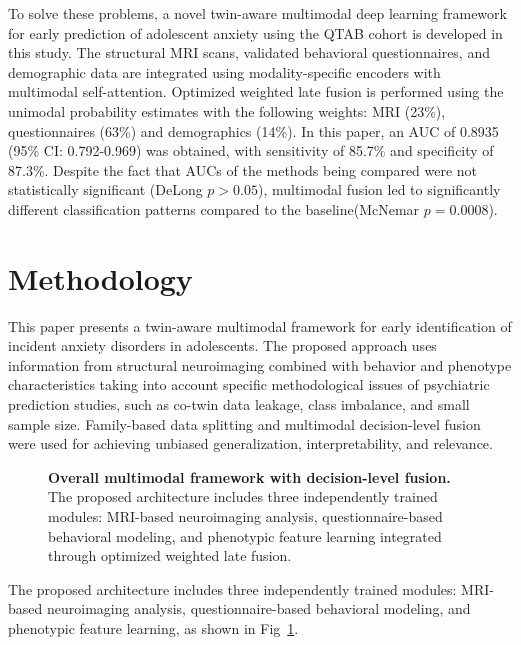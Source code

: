 \documentclass[10pt,letterpaper]{article}
\begin{document}
To solve these problems, a novel twin-aware multimodal deep learning framework for early prediction of adolescent anxiety using the QTAB cohort is developed in this study. The structural MRI scans, validated behavioral questionnaires, and demographic data are integrated using modality-specific encoders with multimodal self-attention. Optimized weighted late fusion is performed using the unimodal probability estimates with the following weights: MRI (23\%), questionnaires (63\%) and demographics (14\%). In this paper, an AUC of 0.8935 (95\% CI: 0.792-0.969) was obtained, with sensitivity of 85.7\% and specificity of 87.3\%. Despite the fact that AUCs of the methods being compared were not statistically significant (DeLong $p> 0.05$), multimodal fusion led to significantly different classification patterns compared to the baseline(McNemar $p=0.0008$).



        \section*{Methodology}

       This paper presents a twin-aware multimodal framework for early identification of incident anxiety disorders in adolescents. The proposed approach uses information from structural neuroimaging combined with behavior and phenotype characteristics taking into account specific methodological issues of psychiatric prediction studies, such as co-twin data leakage, class imbalance, and small sample size. Family-based data splitting and multimodal decision-level fusion were used for achieving unbiased generalization, interpretability, and relevance.

        \begin{figure}[!h]
        \caption{\textbf{Overall multimodal framework with decision-level fusion.}
        The proposed architecture includes three independently trained modules: MRI-based neuroimaging analysis, questionnaire-based behavioral modeling, and phenotypic feature learning integrated through optimized weighted late fusion.}
        \label{fig:main}
        \end{figure}

        The proposed architecture includes three independently trained modules: MRI-based neuroimaging analysis, questionnaire-based behavioral modeling, and phenotypic feature learning, as shown in Fig~\ref{fig:main}.
\end{document}
